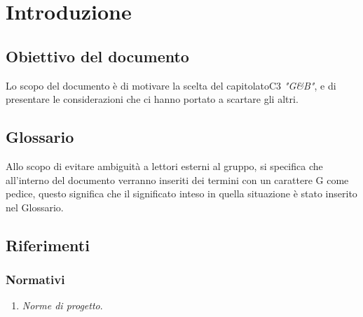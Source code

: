 \section{Introduzione}
	\subsection{Obiettivo del documento}
		Lo scopo del documento è di motivare la scelta del capitolato\pedice C3 \textit{"G\&B"}, e di presentare le considerazioni che ci hanno portato a scartare gli altri.
	\subsection{Glossario}
		Allo scopo di evitare ambiguità a lettori esterni al gruppo, si specifica che all'interno del documento verranno inseriti dei termini con un carattere G come pedice, questo significa che il significato inteso in quella situazione è stato inserito nel Glossario.
		\subsection{Riferimenti}
			\subsubsection{Normativi}
				\begin{enumerate}
					\item \textit{Norme di progetto}.
				\end{enumerate}

